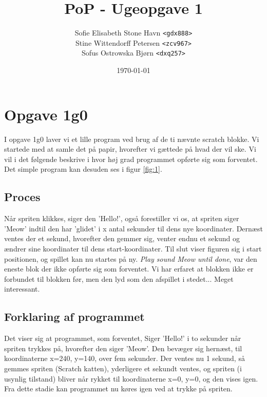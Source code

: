 \documentclass[12pt,a4paper]{article}
\title{PoP - Ugeopgave 1}
\author{Sofie Elisabeth Stone Havn \texttt{<gdx888>}\\ Stine Wittendorff Petersen \texttt{<zcv967>}\\ Sofus Ostrowska Bjørn \texttt{<dxq257>}}
\date{\today}
\begin{document}
\maketitle

\section{Opgave 1g0}

I opgave 1g0 laver vi et lille program ved brug af de ti nævnte scratch blokke. Vi startede med at samle det på papir, hvorefter vi gættede på hvad der vil ske. Vi vil i det følgende beskrive i hvor høj grad programmet opførte sig som forventet. Det simple program kan desuden ses i figur \ref{fig:1}.

\subsection{Proces}
Når spriten klikkes, siger den 'Hello!', også forestiller vi os, at spriten siger 'Meow' indtil den har 'glidet' i x antal sekunder til dens nye koordinater. Dernæst ventes der et sekund, hvorefter den gemmer sig, venter endnu et sekund og ændrer sine koordinater til dens start-koordinater. Til slut viser figuren sig i start positionen, og spillet kan nu startes på ny.
\textit{Play sound Meow until done}, var den eneste blok der ikke opførte sig som forventet. Vi har erfaret at blokken ikke er forbundet til blokken før, men den lyd som den afspillet i stedet... Meget interessant.

\subsection{Forklaring af programmet}
Det viser sig at programmet, som forventet, Siger 'Hello!' i to sekunder når spriten trykkes på, hvorefter den siger 'Meow'. Den bevæger sig hernæst, til koordinaterne x=240, y=140, over fem sekunder. Der ventes nu 1 sekund, så gemmes spriten (Scratch katten), yderligere et sekundt ventes, og spriten (i usynlig tilstand) bliver når rykket til koordinaterne x=0, y=0, og den vises igen. Fra dette stadie kan programmet nu køres igen ved at trykke på spriten.
\end{document}

